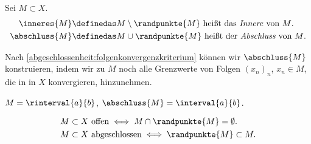 \begin{notation*}
    Sei \( M\subset X \).
    \begin{align*}
        \inneres{M}&\definedas M\setminus \randpunkte{M}\text{ heißt das \emph{Innere} von \( M \).}\\
        \abschluss{M}&\definedas M\cup \randpunkte{M}\text{ heißt der \emph{Abschluss} von \( M \).}
    \end{align*}
\end{notation*}
Nach \ref{abgeschlossenheit:folgenkonvergenzkriterium} können wir \( \abschluss{M} \) konstruieren, indem wir zu \( M \) noch alle Grenzwerte von Folgen \( (x_n)_n \), \( x_n\in M \), die in in \( X \) konvergieren, hinzunehmen.
\begin{beispiel*}
    \( M=\rinterval{a}{b} \), \( \abschluss{M}=\interval{a}{b} \).
\end{beispiel*}
\begin{bemerkung*}
    \begin{align*}
        M&\subset X \text{ offen} \iff M\cap \randpunkte{M}=\emptyset.\\
        M&\subset X \text{ abgeschlossen} \iff \randpunkte{M} \subset M.
    \end{align*}
    
\end{bemerkung*}
